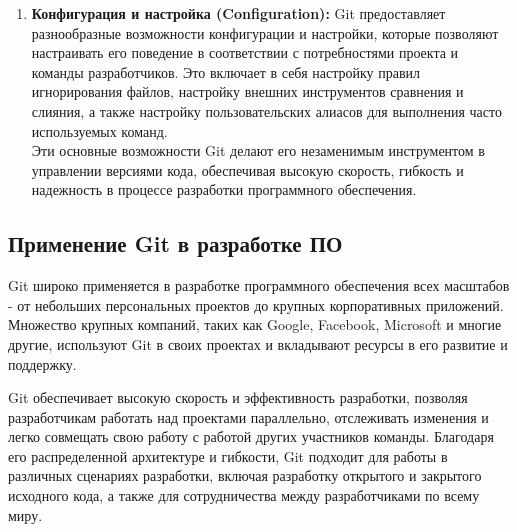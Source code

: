 \begin{enumerate}
    \item \textbf{Конфигурация и настройка (Configuration):} Git предоставляет разнообразные возможности конфигурации и настройки, которые позволяют настраивать его поведение в соответствии с потребностями проекта и команды разработчиков. Это включает в себя настройку правил игнорирования файлов, настройку внешних инструментов сравнения и слияния, а также настройку пользовательских алиасов для выполнения часто используемых команд.\\
    Эти основные возможности Git делают его незаменимым инструментом в управлении версиями кода, обеспечивая высокую скорость, гибкость и надежность в процессе разработки программного обеспечения.
\end{enumerate}

\subsection{\label{subsec:ch01/sec01/sub04}Применение Git в разработке ПО}
Git широко применяется в разработке программного обеспечения всех масштабов - от небольших персональных проектов до крупных корпоративных приложений. Множество крупных компаний, таких как Google, Facebook, Microsoft и многие другие, используют Git в своих проектах и вкладывают ресурсы в его развитие и поддержку.

Git обеспечивает высокую скорость и эффективность разработки, позволяя разработчикам работать над проектами параллельно, отслеживать изменения и легко совмещать свою работу с работой других участников команды. Благодаря его распределенной архитектуре и гибкости, Git подходит для работы в различных сценариях разработки, включая разработку открытого и закрытого исходного кода, а также для сотрудничества между разработчиками по всему миру.